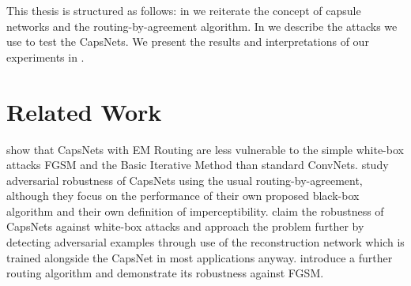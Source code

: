 This thesis is structured as follows: in  we reiterate the concept of capsule networks and the routing-by-agreement algorithm. In  we describe the attacks we use to test the CapsNets. We present the results and interpretations of our experiments in .

\section{Related Work}
\label{sec:related}

\citet{em} show that CapsNets with EM Routing are less vulnerable to the simple white-box attacks FGSM \citep{fgsm} and the Basic Iterative Method \citep{bim} than standard ConvNets.
\citet{capsattacktraffic} study adversarial robustness of CapsNets using the usual routing-by-agreement, although they focus on the performance of their own proposed black-box algorithm and their own definition of imperceptibility.
\citet{darccc} claim the robustness of CapsNets against white-box attacks and approach the problem further by detecting adversarial examples through use of the reconstruction network which is trained alongside the CapsNet in most applications anyway.
\citet{scaledagreement} introduce a further routing algorithm and demonstrate its robustness against FGSM.